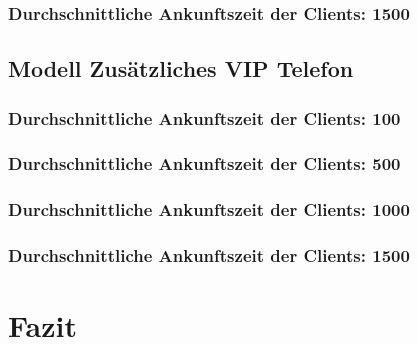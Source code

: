 \subsubsection{Durchschnittliche Ankunftszeit der Clients: 1500}

\subsection{Modell \glqq Zusätzliches VIP Telefon\grqq} 
\subsubsection{Durchschnittliche Ankunftszeit der Clients: 100}
\subsubsection{Durchschnittliche Ankunftszeit der Clients: 500}
\subsubsection{Durchschnittliche Ankunftszeit der Clients: 1000}
\subsubsection{Durchschnittliche Ankunftszeit der Clients: 1500}

\section{Fazit}


